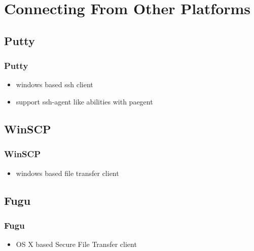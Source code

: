\documentclass[hyperref={pdfpagelabels=false}]{beamer}
\begin{document}
\section{Connecting From Other Platforms}
\subsection{Putty}
\frame
{
    \frametitle{Putty}
    \begin{itemize}
    \item{windows based ssh client}
    \item{support ssh-agent like abilities with paegent}
    \end{itemize}
}
\subsection{WinSCP}
\frame
{
    \frametitle{WinSCP}
    \begin{itemize}
    \item{windows based file transfer client}
    \end{itemize}
}
\subsection{Fugu}
\frame
{
    \frametitle{Fugu}
    \begin{itemize}
    \item{OS X based Secure File Transfer client}
    \end{itemize}
}
\end{document}

